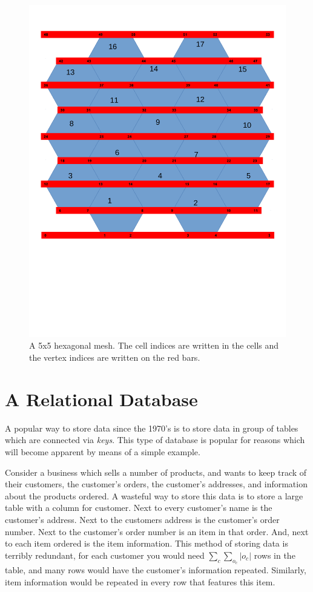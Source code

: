 \begin{figure}
\centering
\includegraphics[height=0.7\textheight]{../diagrams/vert_mesh.pdf}
\caption[A 5x5 Hexagonal Mesh.]{A 5x5 hexagonal mesh. The cell indices are written in the cells and the vertex indices are written on the red bars.}
\label{fig:mesh}
\end{figure}

\section{A Relational Database}
A popular way to store data since the 1970's is to store data in group of tables which are connected via \emph{keys}. This type of database is popular for reasons which will become apparent by means of a simple example. 

Consider a business which sells a number of products, and wants to keep track of their customers, the customer's orders, the customer's addresses, and information about the products ordered. A wasteful way to store this data is to store a large table with a column for customer. Next to every customer's name is the customer's address. Next to the customers address is the customer's order number. Next to the customer's order number is an item in that order. And, next to each item ordered is the item information. This method of storing data is terribly redundant, for each customer you would need $\sum\limits_{c}\sum\limits_{o_c}|o_c|$ rows in the table, and many rows would have the customer's information repeated. Similarly, item information would be repeated in every row that features this item. 

